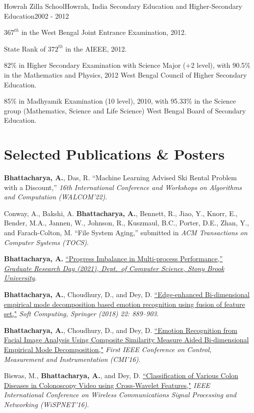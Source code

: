 \documentclass[letterpaper,10pt]{article}
\begin{document}
\resumeItemListEnd
\resumeSubheading
{Howrah Zilla School}{Howrah, India}
{Secondary Education and Higher-Secondary Education}{2002 - 2012}
\resumeItemListStart
    \item {$ 367^{th}$ in the West Bengal Joint Entrance Examination, 2012.}
    \item {State Rank of $ 372^{th}$ in the AIEEE, 2012.}
    \item {82\% in Higher Secondary Examination with Science Major (+2 level), with 90.5\% in the Mathematics and Physics, 2012 West Bengal Council of Higher Secondary Education.}
    \item {85\% in Madhyamik Examination (10 level), 2010, with 95.33\% in the Science group (Mathematics, Science and Life Science) West Bengal Board of Secondary Education.}
\resumeItemListEnd
\resumeSubHeadingListEnd 


\section{Selected Publications \& Posters}
\resumeSubHeadingListStart
\item{\textbf{Bhattacharya, A.}, Das, R. {``Machine Learning Advised Ski Rental Problem with a Discount,''} \textit{16th International Conference and Workshops on Algorithms and Computation (WALCOM'22)}.}
\item {Conway, A., Bakshi, A. \textbf{Bhattacharya, A.}, Bennett, R., Jiao, Y., Knorr, E., Bender, M.A., Jannen, W., Johnson, R., Kuszmaul, B.C., Porter, D.E., Zhan, Y., and Farach-Colton, M. {``File System Aging,''} submitted in \textit{ACM Transactions on Computer Systems (TOCS)}.}
\item {\textbf{Bhattacharya, A.} \href{https://www3.cs.stonybrook.edu/~grd/posters/GRD_2021_Poster_Arghya_Bhattacharya.pdf}{``Progress Imbalance in Multi-process Performance,''} \href{https://www3.cs.stonybrook.edu/~grd/index.html}{\textit{Graduate Research Day (2021), Dept.\ of Computer Science, Stony Brook University}}.}
\item {\textbf{Bhattacharya, A.}, Choudhury, D., and Dey, D. \href{https://doi.org/10.1007/s00500-016-2395-4}{``Edge-enhanced Bi-dimensional empirical mode decomposition based emotion recognition using fusion of feature set,"} \textit{Soft Computing, Springer (2018) 22: 889--903}.}
\item {\textbf{Bhattacharya, A.}, Choudhury, D., and Dey, D. \href{https://doi.org/10.1109/CMI.2016.7413766}{``Emotion Recognition from Facial Image Analysis Using Composite Similarity Measure Aided Bi-dimensional Empirical Mode Decomposition,"} \textit{First IEEE Conference on Control, Measurement and Instrumentation (CMI’16)}.}
\item {Biswas, M., \textbf{Bhattacharya, A.}, and Dey, D. \href{https://doi.org/10.1109/WiSPNET.2016.7566521} {``Classification of Various Colon Diseases in Colonoscopy Video using Cross-Wavelet Features,"} \textit{IEEE International Conference on Wireless Communications Signal Processing and Networking (WiSPNET'16)}.}
\resumeSubHeadingListEnd
\end{document}
